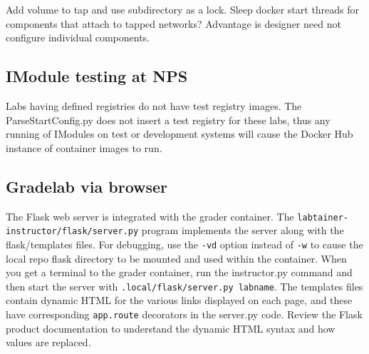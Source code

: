 \documentclass[12pt]{article}
\begin{document}
Add volume to tap and use subdirectory as a lock.  Sleep docker start threads for components that attach to
tapped networks?  Advantage is designer need not configure individual components.  

\subsection{IModule testing at NPS}
Labs having defined registries do not have test registry images.  The ParseStartConfig.py does not insert a test registry
for these labs, thus any running of IModules on test or development systems will cause the Docker Hub instance of container
images to run.

\subsection{Gradelab via browser}
The Flask web server is integrated with the grader container.  The {\tt labtainer-instructor/flask/server.py} program implements
the server along with the flask/templates files.  For debugging, use the {\tt -vd} option instead of {\tt -w} to cause the local repo
flask directory to be mounted and used within the container.  When you get a terminal to the grader container, run the instructor.py command
and then start the server with {\tt .local/flask/server.py labname}.  The templates files contain dynamic HTML for the various links displayed
on each page, and these have corresponding {\tt app.route} decorators in the server.py code.  Review the Flask product documentation to understand the dynamic HTML syntax and how values are replaced.
\end{document}
